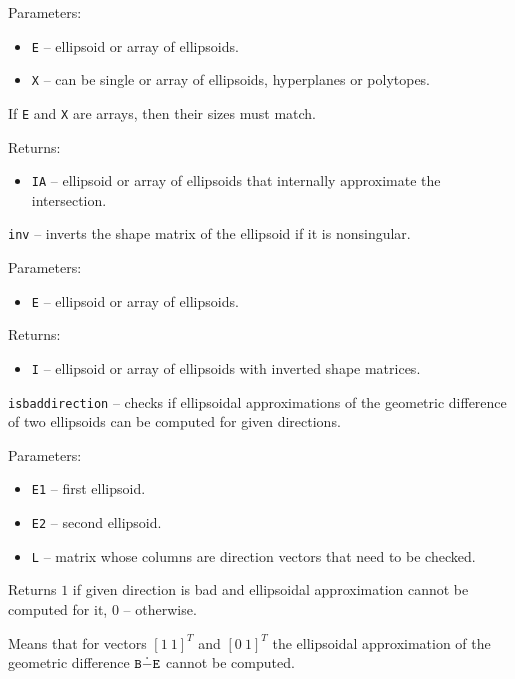 Parameters:
\begin{itemize}
\item {\tt E} -- ellipsoid or array of ellipsoids.
\item {\tt X} -- can be single or array of ellipsoids, hyperplanes or polytopes.
\end{itemize}
If {\tt E} and {\tt X} are arrays, then their sizes must match.

Returns:
\begin{itemize}
\item {\tt IA} -- ellipsoid or array of ellipsoids that internally approximate
the intersection.
\end{itemize}



\newpage

{\Large {\tt inv}} -- inverts the shape matrix of the ellipsoid if it is
nonsingular.

Parameters:
\begin{itemize}
\item {\tt E} -- ellipsoid or array of ellipsoids.
\end{itemize}

Returns:
\begin{itemize}
\item {\tt I} -- ellipsoid or array of ellipsoids with inverted shape matrices.
\end{itemize}

\newpage

{\Large {\tt isbaddirection}} -- checks if ellipsoidal approximations of
the geometric difference of two ellipsoids can be computed for given
directions.

Parameters:
\begin{itemize}
\item {\tt E1} -- first ellipsoid.
\item {\tt E2} -- second ellipsoid.
\item {\tt L} -- matrix whose columns are direction vectors that need to be
checked.
\end{itemize}

Returns $1$ if given direction is bad and ellipsoidal approximation cannot
be computed for it, $0$ -- otherwise.


Means that for vectors $[1 ~ 1]^T$ and $[0 ~ 1]^T$ the ellipsoidal approximation
of the geometric difference ${\tt B}\dot{-}{\tt E}$ cannot be computed.

